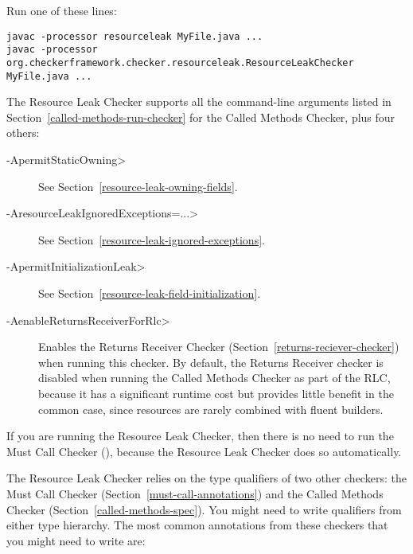 
Run one of these lines:

\begin{Verbatim}
javac -processor resourceleak MyFile.java ...
javac -processor org.checkerframework.checker.resourceleak.ResourceLeakChecker MyFile.java ...
\end{Verbatim}

The Resource Leak Checker supports all the command-line arguments
listed in Section~\ref{called-methods-run-checker} for
the Called Methods Checker, plus four others:

\begin{description}
\item[\<-ApermitStaticOwning>]
  See Section~\ref{resource-leak-owning-fields}.
\item[\<-AresourceLeakIgnoredExceptions=...>]
  See Section~\ref{resource-leak-ignored-exceptions}.
\item[\<-ApermitInitializationLeak>]
  See Section~\ref{resource-leak-field-initialization}.
\item[\<-AenableReturnsReceiverForRlc>]
  Enables the Returns Receiver Checker (Section~\ref{returns-reciever-checker})
  when running this checker. By default, the Returns Receiver checker is
  disabled when running the Called Methods Checker as part of the RLC,
  because it has a significant runtime cost but provides little benefit in the common case,
  since resources are rarely combined with fluent builders.
\end{description}

If you are running the Resource Leak Checker, then there is no need to run
the Must Call Checker (), because the
Resource Leak Checker does so automatically.



The Resource Leak Checker relies on the type qualifiers of two other checkers:
the Must Call Checker (Section~\ref{must-call-annotations}) and
the Called Methods Checker (Section~\ref{called-methods-spec}). You might need
to write qualifiers from either type hierarchy. The most common annotations from
these checkers that you might need to write are:

